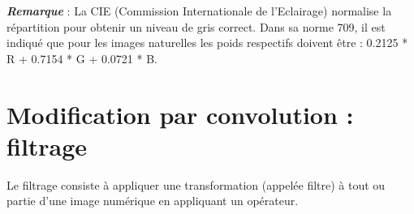 \textit{\textbf{Remarque}} : La CIE (Commission Internationale de l'Eclairage) normalise la répartition pour obtenir un niveau de gris correct.
Dans sa norme 709, il est indiqué que pour les images naturelles les poids
respectifs doivent être : 0.2125 * R + 0.7154 * G + 0.0721 * B.


%



\section{Modification par convolution : filtrage}
Le filtrage consiste à appliquer une transformation (appelée filtre) à tout ou partie d'une image numérique en
appliquant un opérateur.

%   
%  


